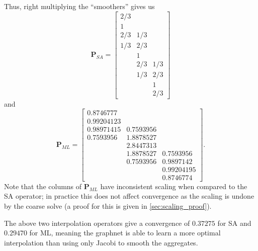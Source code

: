 \documentclass{article}
\newcommand{\mat}[1]{\bm{{#1}}}
\newcommand{\sfrac}[2]{#1/#2}
\begin{document}
Thus, right multiplying the ``smoothers'' gives us
\begin{equation}
  \mat{P}_{SA} = \begin{bmatrix}
\sfrac{2}{3} &  &  \\
1 &  &  \\
\sfrac{2}{3} & \sfrac{1}{3} &  \\
\sfrac{1}{3} & \sfrac{2}{3} &  \\
 & 1 &  \\
 & \sfrac{2}{3} & \sfrac{1}{3} \\
 & \sfrac{1}{3} & \sfrac{2}{3} \\
 &  & 1 \\
 &  & \sfrac{2}{3}
\end{bmatrix}
\end{equation}
and
\begin{equation}
  \mat{P}_{ML} =\begin{bmatrix}
0.8746777 &  &  \\
0.99204123 &  &  \\
0.98971415 & 0.7593956 &  \\
0.7593956 & 1.8878527 &  \\
 & 2.8447313 &  \\
 & 1.8878527 & 0.7593956 \\
 & 0.7593956 & 0.9897142 \\
 &  & 0.99204195 \\
 &  & 0.8746774
\end{bmatrix}.
\end{equation}
Note that the columns of $\mat{P}_{ML}$ have inconsistent scaling when compared to the SA operator; in practice this does not affect convergence as the scaling is undone by the coarse solve (a proof for this is given in \ref{sec:scaling_proof}).

The above two interpolation operators give a convergence of $0.37275$ for SA and $0.29470$ for ML, meaning the graphnet is able to learn a more optimal interpolation than using only Jacobi to smooth the aggregates.
\end{document}

